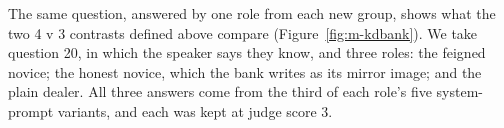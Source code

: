 The same question, answered by one role from each new group, shows what the two 4 v 3 contrasts defined above compare (Figure~\ref{fig:m-kdbank}). %
We take question 20, in which the speaker says they know, and three roles: the feigned novice; the honest novice, which the bank writes as its mirror image; and the plain dealer. %
All three answers come from the third of each role's five system-prompt variants, and each was kept at judge score 3. %
